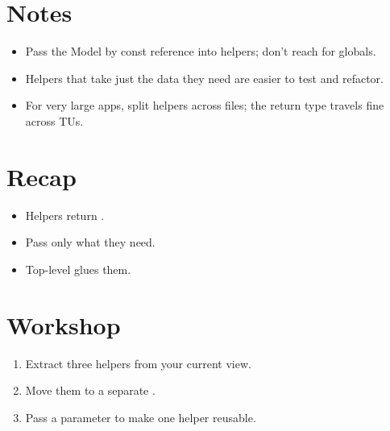 \section{Notes}

\begin{itemize}[leftmargin=*]
  \item Pass the Model by const reference into helpers;
    don't reach for globals.
  \item Helpers that take just the data they need are
    easier to test and refactor.
  \item For very large apps, split helpers across files; the
     return type travels fine across TUs.
\end{itemize}

\section{Recap}

\begin{recap}
\begin{itemize}[leftmargin=*]
  \item Helpers return .
  \item Pass only what they need.
  \item Top-level  glues them.
\end{itemize}
\end{recap}

\section*{Workshop}

\begin{enumerate}[leftmargin=*]
  \item Extract three helpers from your current view.
  \item Move them to a separate .
  \item Pass a parameter to make one helper reusable.
\end{enumerate}

